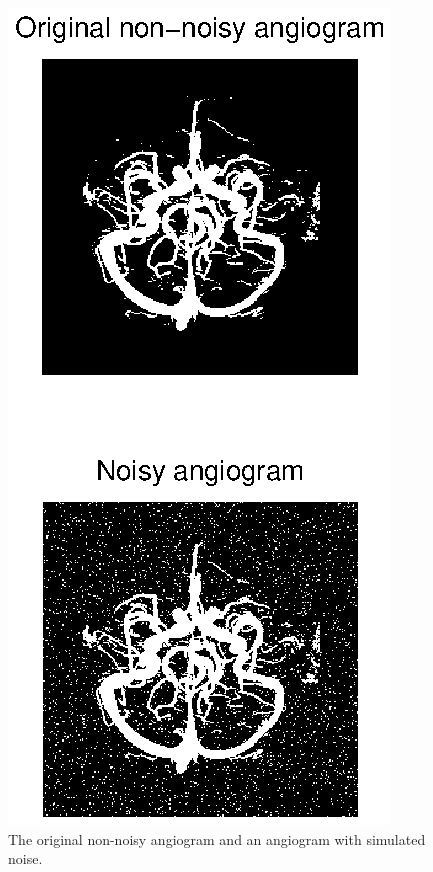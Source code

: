 \begin{figure}[htb]
 \centering
 \includegraphics[width=\linewidth]{angio_and_noisy.eps}
 \caption{The original non-noisy angiogram and an angiogram with simulated noise.}
 \label{fig:angio_and_noisy}
\end{figure}

